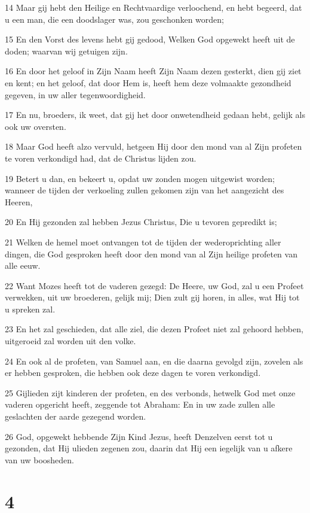 \par 14 Maar gij hebt den Heilige en Rechtvaardige verloochend, en hebt begeerd, dat u een man, die een doodslager was, zou geschonken worden;
\par 15 En den Vorst des levens hebt gij gedood, Welken God opgewekt heeft uit de doden; waarvan wij getuigen zijn.
\par 16 En door het geloof in Zijn Naam heeft Zijn Naam dezen gesterkt, dien gij ziet en kent; en het geloof, dat door Hem is, heeft hem deze volmaakte gezondheid gegeven, in uw aller tegenwoordigheid.
\par 17 En nu, broeders, ik weet, dat gij het door onwetendheid gedaan hebt, gelijk als ook uw oversten.
\par 18 Maar God heeft alzo vervuld, hetgeen Hij door den mond van al Zijn profeten te voren verkondigd had, dat de Christus lijden zou.
\par 19 Betert u dan, en bekeert u, opdat uw zonden mogen uitgewist worden; wanneer de tijden der verkoeling zullen gekomen zijn van het aangezicht des Heeren,
\par 20 En Hij gezonden zal hebben Jezus Christus, Die u tevoren gepredikt is;
\par 21 Welken de hemel moet ontvangen tot de tijden der wederoprichting aller dingen, die God gesproken heeft door den mond van al Zijn heilige profeten van alle eeuw.
\par 22 Want Mozes heeft tot de vaderen gezegd: De Heere, uw God, zal u een Profeet verwekken, uit uw broederen, gelijk mij; Dien zult gij horen, in alles, wat Hij tot u spreken zal.
\par 23 En het zal geschieden, dat alle ziel, die dezen Profeet niet zal gehoord hebben, uitgeroeid zal worden uit den volke.
\par 24 En ook al de profeten, van Samuel aan, en die daarna gevolgd zijn, zovelen als er hebben gesproken, die hebben ook deze dagen te voren verkondigd.
\par 25 Gijlieden zijt kinderen der profeten, en des verbonds, hetwelk God met onze vaderen opgericht heeft, zeggende tot Abraham: En in uw zade zullen alle geslachten der aarde gezegend worden.
\par 26 God, opgewekt hebbende Zijn Kind Jezus, heeft Denzelven eerst tot u gezonden, dat Hij ulieden zegenen zou, daarin dat Hij een iegelijk van u afkere van uw boosheden.

\chapter{4}

